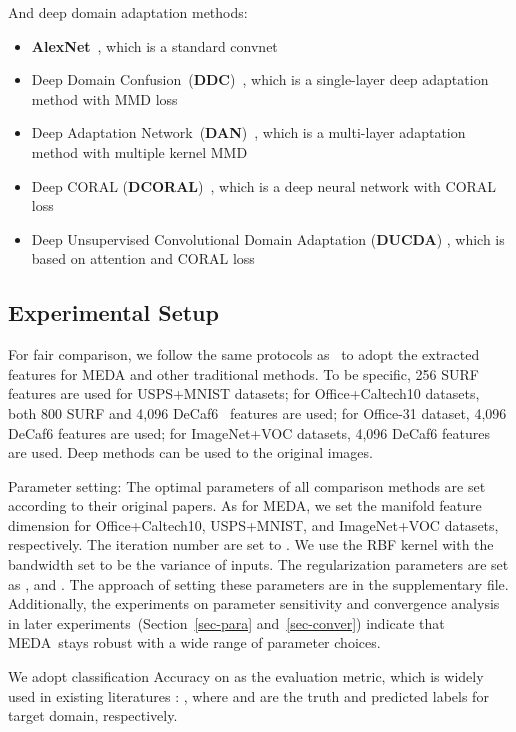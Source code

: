 \documentclass[sigconf]{acmart}
\begin{document}
And deep domain adaptation methods:

\begin{itemize}[noitemsep,nolistsep]
	\item \textbf{AlexNet}~\cite{krizhevsky2012imagenet}, which is a standard convnet
	\item Deep Domain Confusion~(\textbf{DDC})~\cite{tzeng2014deep}, which is a single-layer deep adaptation method with MMD loss
	\item Deep Adaptation Network~(\textbf{DAN})~\cite{long2015domain}, which is a multi-layer adaptation method with multiple kernel MMD
	\item Deep CORAL (\textbf{DCORAL})~\cite{sun2016deep}, which is a deep neural network with CORAL loss
	\item Deep Unsupervised Convolutional Domain Adaptation (\textbf{DUCDA}) \cite{zhuo2017deep}, which is based on attention and CORAL loss
\end{itemize}

\subsection{Experimental Setup}

For fair comparison, we follow the same protocols as~\cite{zhang2017joint,zhuo2017deep,wang2017balanced} to adopt the extracted features for MEDA and other traditional methods. To be specific, 256 SURF features are used for USPS+MNIST datasets; for Office+Caltech10 datasets, both 800 SURF and 4,096 DeCaf6~\cite{donahue2014decaf} features are used; for Office-31 dataset, 4,096 DeCaf6 features are used; for ImageNet+VOC datasets, 4,096 DeCaf6 features are used. Deep methods can be used to the original images. 

Parameter setting: The optimal parameters of all comparison methods are set according to their original papers. As for MEDA, we set the manifold feature dimension  for Office+Caltech10, USPS+MNIST, and ImageNet+VOC datasets, respectively. The iteration number are set to . We use the RBF kernel with the bandwidth set to be the variance of inputs. The regularization parameters are set as , and . The approach of setting these parameters are in the supplementary file. Additionally, the experiments on parameter sensitivity and convergence analysis in later experiments~(Section~\ref{sec-para} and~\ref{sec-conver}) indicate that MEDA~stays robust with a wide range of parameter choices.

We adopt classification Accuracy on  as the evaluation metric, which is widely used in existing literatures \cite{pan2011domain,wang2017balanced,gong2012geodesic}: , where  and  are the truth and predicted labels for target domain, respectively.
\end{document}

